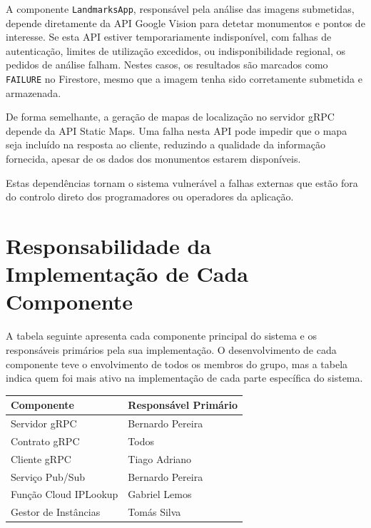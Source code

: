 A componente \texttt{LandmarksApp}, responsável pela análise das imagens submetidas, depende diretamente da API Google Vision para detetar monumentos e pontos de interesse. Se esta API estiver temporariamente indisponível, com falhas de autenticação, limites de utilização excedidos, ou indisponibilidade regional, os pedidos de análise falham. Nestes casos, os resultados são marcados como \texttt{FAILURE} no Firestore, mesmo que a imagem tenha sido corretamente submetida e armazenada.

De forma semelhante, a geração de mapas de localização no servidor gRPC depende da API Static Maps. Uma falha nesta API pode impedir que o mapa seja incluído na resposta ao cliente, reduzindo a qualidade da informação fornecida, apesar de os dados dos monumentos estarem disponíveis.

Estas dependências tornam o sistema vulnerável a falhas externas que estão fora do controlo direto dos programadores ou operadores da aplicação.

\chapter{Responsabilidade da Implementação de Cada Componente}
\label{sec:component_responsibilities}

A tabela seguinte apresenta cada componente principal do sistema e os responsáveis primários pela sua implementação. O
desenvolvimento de cada componente teve o envolvimento de todos os membros do grupo, mas a tabela indica quem foi
mais ativo na implementação de cada parte específica do sistema.

\begin{center}
\begin{tabular}{|l|l|}
\hline
\textbf{Componente}           & \textbf{Responsável Primário}      \\
\hline
Servidor gRPC                 & Bernardo Pereira                   \\
Contrato gRPC                 & Todos                              \\
Cliente gRPC                  & Tiago Adriano                      \\
Serviço Pub/Sub               & Bernardo Pereira                   \\
Função Cloud IPLookup         & Gabriel Lemos                      \\
Gestor de Instâncias          & Tomás Silva                        \\
\hline
\end{tabular}
\end{center}
